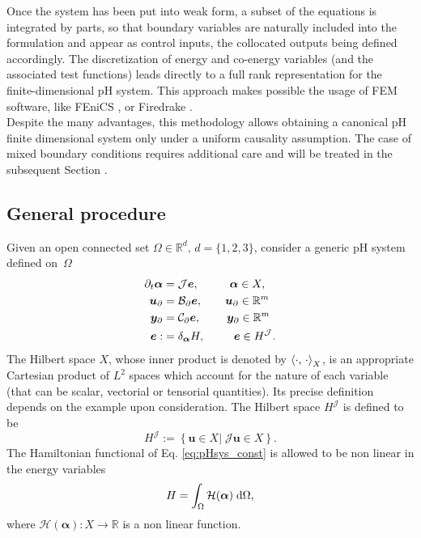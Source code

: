 Once the system has been put into weak form, a subset of the equations is integrated by parts, so that boundary variables are naturally included into the formulation and appear as control inputs, the collocated outputs being defined accordingly. The discretization of energy and co-energy variables (and the associated test functions) leads directly to a full rank representation for the finite-dimensional pH system.  This approach makes possible the usage of FEM software, like FEniCS \cite{logg2012}, or Firedrake \cite{rathgeber2017firedrake}. \\

Despite the many advantages, this methodology allows obtaining a canonical pH finite dimensional system only under a uniform causality assumption. The case of mixed boundary conditions requires additional care and will be treated in the subsequent Section .


\subsection{General procedure}
Given an open connected set $\Omega \in \mathbb{R}^d,\, d= \{1,2,3\}$, consider a generic pH system defined on~$\Omega$
\begin{align}
\partial_t {\bm{\alpha}} &= \mathcal{J}\displaystyle \bm{e}, \qquad \;\;\, \bm{\alpha} \in X, \label{eq:pHsys_dyn} \vspace{3pt}\\
\bm{u}_\partial &= \mathcal{B}_\partial  \displaystyle \bm{e}, \qquad \bm{u}_\partial \in \mathbb{R}^m \label{eq:pHsys_u} \vspace{3pt}\\
\bm{y}_\partial &= \mathcal{C}_\partial \displaystyle \bm{e}, \qquad \; \bm{y}_\partial \in \mathbb{R}^m \label{eq:pHsys_y} \vspace{3pt}\\
\bm{e} :&= \displaystyle \delta_{\bm{\alpha}}H, \qquad \;\; \bm{e} \in H^\mathcal{J}. \label{eq:pHsys_const}
\end{align}
The Hilbert space $X$, whose inner product is denoted by $\inner[X]{\cdot}{\cdot}$, is an appropriate Cartesian product of $L^2$ spaces which account for the nature of each variable (that can be scalar, vectorial or tensorial quantities). Its precise definition depends on the example upon consideration. The Hilbert space $H^\mathcal{J}$ is defined to be 
\begin{equation}
	H^\mathcal{J} :=\left\{\bm{u} \in X \vert \; \mathcal{J}\bm{u} \in X  \right\}.
\end{equation}
 The Hamiltonian functional of Eq. \eqref{eq:pHsys_const} is allowed to be non linear in the energy variables
\begin{equation*}
H = \int_\Omega \mathcal{H}(\bm{\alpha}) \d\Omega,
\end{equation*}
where $\mathcal{H}(\bm{\alpha}): X \rightarrow \mathbb{R}$ is a non linear function.
\\

